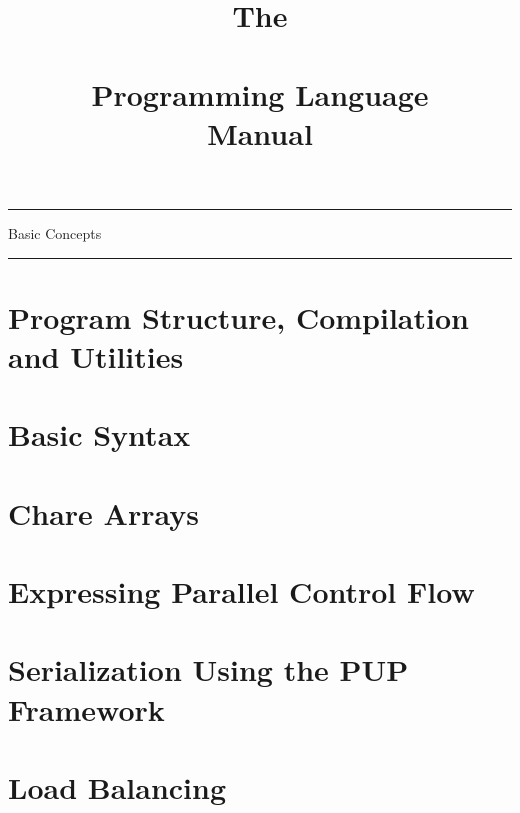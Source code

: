 \documentclass[10pt]{article}
\begin{document}
\title{The\\ \charmpp\\ Programming Language\\ Manual}
\credits{\hspace{0 in}}
\maketitle



\begin{titlepage}%
 \rule{\textwidth}{3pt}
 \vspace{\fill}
 \begin{flushright}
   \textsf{\Huge Basic Concepts \\}
 \end{flushright}
 \vspace{\fill}
 \rule{\textwidth}{3pt}
\end{titlepage}



\section{Program Structure, Compilation and Utilities}
  	
  
  

\section{Basic Syntax}
  	
  
  

\section{Chare Arrays}
  

\section{Expressing Parallel Control Flow}
  

\section{Serialization Using the PUP Framework}
  

\section{Load Balancing}
  
\end{document}
